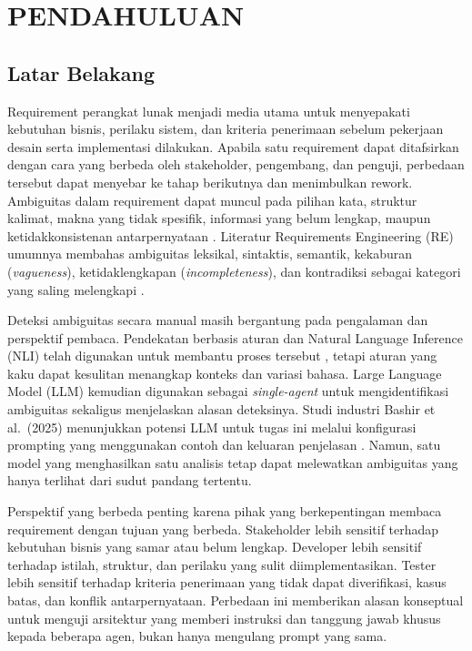 \chapter{PENDAHULUAN}

\section{Latar Belakang}

Requirement perangkat lunak menjadi media utama untuk menyepakati kebutuhan bisnis, perilaku sistem, dan kriteria penerimaan sebelum pekerjaan desain serta implementasi dilakukan. Apabila satu requirement dapat ditafsirkan dengan cara yang berbeda oleh stakeholder, pengembang, dan penguji, perbedaan tersebut dapat menyebar ke tahap berikutnya dan menimbulkan rework. Ambiguitas dalam requirement dapat muncul pada pilihan kata, struktur kalimat, makna yang tidak spesifik, informasi yang belum lengkap, maupun ketidakkonsistenan antarpernyataan \cite{berry2000,kamsties1998,wiegers2003}. Literatur Requirements Engineering (RE) umumnya membahas ambiguitas leksikal, sintaktis, semantik, kekaburan (\textit{vagueness}), ketidaklengkapan (\textit{incompleteness}), dan kontradiksi sebagai kategori yang saling melengkapi \cite{berry2004}.

Deteksi ambiguitas secara manual masih bergantung pada pengalaman dan perspektif pembaca. Pendekatan berbasis aturan dan Natural Language Inference (NLI) telah digunakan untuk membantu proses tersebut \cite{ferrara2014}, tetapi aturan yang kaku dapat kesulitan menangkap konteks dan variasi bahasa. Large Language Model (LLM) kemudian digunakan sebagai \textit{single-agent} untuk mengidentifikasi ambiguitas sekaligus menjelaskan alasan deteksinya. Studi industri Bashir et al.\ (2025) menunjukkan potensi LLM untuk tugas ini melalui konfigurasi prompting yang menggunakan contoh dan keluaran penjelasan \cite{bashir2025}. Namun, satu model yang menghasilkan satu analisis tetap dapat melewatkan ambiguitas yang hanya terlihat dari sudut pandang tertentu.

Perspektif yang berbeda penting karena pihak yang berkepentingan membaca requirement dengan tujuan yang berbeda. Stakeholder lebih sensitif terhadap kebutuhan bisnis yang samar atau belum lengkap. Developer lebih sensitif terhadap istilah, struktur, dan perilaku yang sulit diimplementasikan. Tester lebih sensitif terhadap kriteria penerimaan yang tidak dapat diverifikasi, kasus batas, dan konflik antarpernyataan. Perbedaan ini memberikan alasan konseptual untuk menguji arsitektur yang memberi instruksi dan tanggung jawab khusus kepada beberapa agen, bukan hanya mengulang prompt yang sama.

